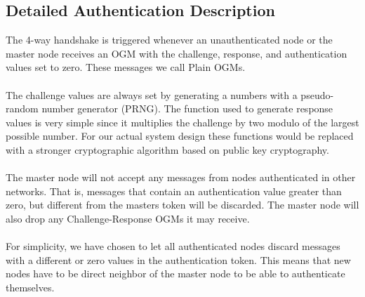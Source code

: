 \subsection{Detailed Authentication Description}
The 4-way handshake is triggered whenever an unauthenticated node or the master node receives an OGM with the challenge, response, and authentication values set to zero. These messages we call Plain OGMs. 
\\\\
The challenge values are always set by generating a numbers with a pseudo-random number generator (PRNG). The function used to generate response values is very simple since it multiplies the challenge by two modulo of the largest possible number. For our actual system design these functions would be replaced with a stronger cryptographic algorithm based on public key cryptography.
\\\\
The master node will not accept any messages from nodes authenticated in other networks. That is, messages that contain an authentication value greater than zero, but different from the masters token will be discarded. The master node will also drop any Challenge-Response OGMs it may receive.
\\\\
For simplicity, we have chosen to let all authenticated nodes discard messages with a different or zero values in the authentication token. This means that new nodes have to be direct neighbor of the master node to be able to authenticate themselves.

